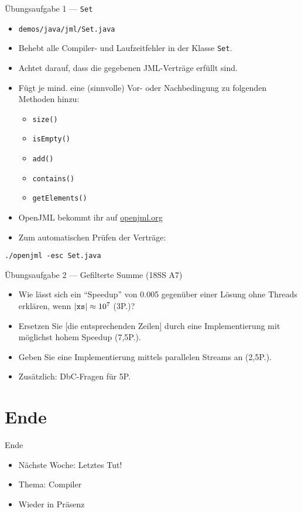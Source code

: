 \documentclass{beamer}
\begin{document}
\begin{frame}{Übungsaufgabe 1 --- \texttt{Set}}
	\begin{itemize}
		\item \texttt{demos/java/jml/Set.java}
		\item Behebt alle Compiler- und Laufzeitfehler in der Klasse \texttt{Set}.
		\pause
		\item Achtet darauf, dass die gegebenen JML-Verträge erfüllt sind.
		\pause
		\item Fügt je mind. eine (sinnvolle) Vor- oder Nachbedingung zu folgenden Methoden hinzu:
		\begin{itemize}
			\item \texttt{size()}
			\item \texttt{isEmpty()}
			\item \texttt{add()}
			\item \texttt{contains()}
			\item \texttt{getElements()}
		\end{itemize}
	\end{itemize}

        \vfill

        \begin{itemize}
          \item OpenJML bekommt ihr auf \href{https://openjml.org}{openjml.org}
          \item Zum automatischen Prüfen der Verträge:
        \end{itemize}
        \footnotesize
        \texttt{./openjml -esc Set.java}
\end{frame}

\begin{frame}{Übungsaufgabe 2 --- Gefilterte Summe (18SS A7)}

	\begin{itemize}
		\item Wie lässt sich ein \enquote{Speedup} von 0.005 gegenüber einer Lösung ohne Threads erklären, wenn $|\textrm{\texttt{xs}}| \approx 10^7$ (3P.)?
		\item Ersetzen Sie [die entsprechenden Zeilen] durch eine Implementierung mit möglichst hohem Speedup (7,5P.).
		\item Geben Sie eine Implementierung mittels parallelen Streams an (2,5P.).
		\item Zusätzlich: DbC-Fragen für 5P.
	\end{itemize}
\end{frame}

\section{Ende}

\begin{frame}{Ende}
	\begin{itemize}
		\item Nächste Woche: Letztes Tut!
		\item Thema: Compiler
		\item Wieder in Präsenz
	\end{itemize}
\end{frame}
\end{document}
